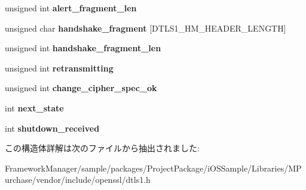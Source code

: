 \begin{DoxyCompactItemize}
\item 
\hypertarget{structdtls1__state__st_afc29db2cfa1741bc83934534a82c9c99}{}unsigned int {\bfseries alert\+\_\+fragment\+\_\+len}\label{structdtls1__state__st_afc29db2cfa1741bc83934534a82c9c99}

\item 
\hypertarget{structdtls1__state__st_a1fca455e80d0a3036c79d9209ac51633}{}unsigned char {\bfseries handshake\+\_\+fragment} \mbox{[}D\+T\+L\+S1\+\_\+\+H\+M\+\_\+\+H\+E\+A\+D\+E\+R\+\_\+\+L\+E\+N\+G\+T\+H\mbox{]}\label{structdtls1__state__st_a1fca455e80d0a3036c79d9209ac51633}

\item 
\hypertarget{structdtls1__state__st_abeb5303866e89417b37551332cf28f08}{}unsigned int {\bfseries handshake\+\_\+fragment\+\_\+len}\label{structdtls1__state__st_abeb5303866e89417b37551332cf28f08}

\item 
\hypertarget{structdtls1__state__st_a55559920472b96c76fbe4b1bf83c62e5}{}unsigned int {\bfseries retransmitting}\label{structdtls1__state__st_a55559920472b96c76fbe4b1bf83c62e5}

\item 
\hypertarget{structdtls1__state__st_a1d0bfd86d37d9058a404a119b2f68ee9}{}unsigned int {\bfseries change\+\_\+cipher\+\_\+spec\+\_\+ok}\label{structdtls1__state__st_a1d0bfd86d37d9058a404a119b2f68ee9}

\item 
\hypertarget{structdtls1__state__st_ab36e1f11a227d22300d6de44ea3ca7c7}{}int {\bfseries next\+\_\+state}\label{structdtls1__state__st_ab36e1f11a227d22300d6de44ea3ca7c7}

\item 
\hypertarget{structdtls1__state__st_adb9566c47686031f7236b44b25ff6356}{}int {\bfseries shutdown\+\_\+received}\label{structdtls1__state__st_adb9566c47686031f7236b44b25ff6356}

\end{DoxyCompactItemize}


この構造体詳解は次のファイルから抽出されました\+:\begin{DoxyCompactItemize}
\item 
Framework\+Manager/sample/packages/\+Project\+Package/i\+O\+S\+Sample/\+Libraries/\+M\+Purchase/vendor/include/openssl/dtls1.\+h\end{DoxyCompactItemize}
